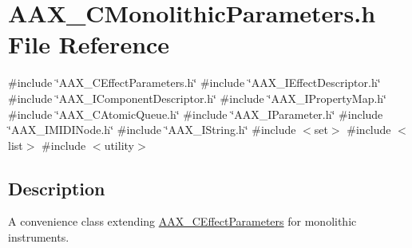 \hypertarget{a00746}{}\section{A\+A\+X\+\_\+\+C\+Monolithic\+Parameters.\+h File Reference}
\label{a00746}
{\ttfamily \#include \char`\"{}A\+A\+X\+\_\+\+C\+Effect\+Parameters.\+h\char`\"{}}\newline
{\ttfamily \#include \char`\"{}A\+A\+X\+\_\+\+I\+Effect\+Descriptor.\+h\char`\"{}}\newline
{\ttfamily \#include \char`\"{}A\+A\+X\+\_\+\+I\+Component\+Descriptor.\+h\char`\"{}}\newline
{\ttfamily \#include \char`\"{}A\+A\+X\+\_\+\+I\+Property\+Map.\+h\char`\"{}}\newline
{\ttfamily \#include \char`\"{}A\+A\+X\+\_\+\+C\+Atomic\+Queue.\+h\char`\"{}}\newline
{\ttfamily \#include \char`\"{}A\+A\+X\+\_\+\+I\+Parameter.\+h\char`\"{}}\newline
{\ttfamily \#include \char`\"{}A\+A\+X\+\_\+\+I\+M\+I\+D\+I\+Node.\+h\char`\"{}}\newline
{\ttfamily \#include \char`\"{}A\+A\+X\+\_\+\+I\+String.\+h\char`\"{}}\newline
{\ttfamily \#include $<$set$>$}\newline
{\ttfamily \#include $<$list$>$}\newline
{\ttfamily \#include $<$utility$>$}\newline


\subsection{Description}
A convenience class extending \mbox{\hyperlink{a01481}{A\+A\+X\+\_\+\+C\+Effect\+Parameters}} for monolithic instruments. 

